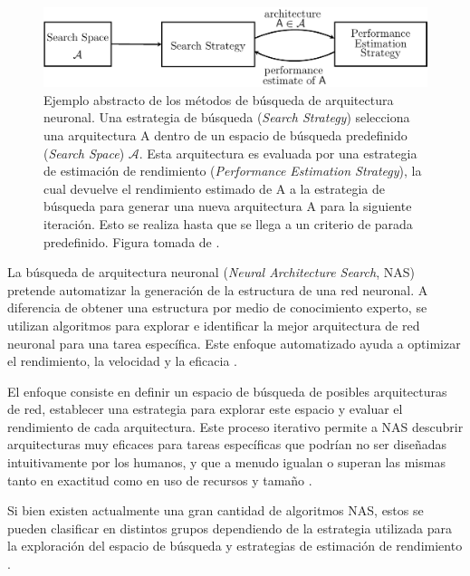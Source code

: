 \begin{figure}[h]
    \centering
    \includegraphics[width=0.8\linewidth]{figures/2_theory/nas_example.pdf}
    \caption[Ejemplo abstracto de los métodos de búsqueda de arquitectura neuronal]{Ejemplo abstracto de los métodos de búsqueda de arquitectura neuronal. Una estrategia de búsqueda (\textit{Search Strategy}) selecciona una arquitectura A dentro de un espacio de búsqueda predefinido (\textit{Search Space}) $\mathcal{A}$. Esta arquitectura es evaluada por una estrategia de estimación de rendimiento (\textit{Performance Estimation Strategy}), la cual devuelve el rendimiento estimado de A a la estrategia de búsqueda para generar una nueva arquitectura A para la siguiente iteración. Esto se realiza hasta que se llega a un criterio de parada predefinido. Figura tomada de \cite{elsken_neural_2018}.}

    \label{nas_example}
\end{figure}

La búsqueda de arquitectura neuronal (\textit{Neural Architecture Search}, NAS) \cite{zoph_neural_2017} pretende automatizar la generación de la estructura de una red neuronal. A diferencia de obtener una estructura por medio de conocimiento experto, se utilizan algoritmos para explorar e identificar la mejor arquitectura de red neuronal para una tarea específica. Este enfoque automatizado ayuda a optimizar el rendimiento, la velocidad y la eficacia \cite{ultralytics_busqueda_nas}.

El enfoque consiste en definir un espacio de búsqueda de posibles arquitecturas de red, establecer una estrategia para explorar este espacio y evaluar el rendimiento de cada arquitectura. Este proceso iterativo permite a NAS descubrir arquitecturas muy eficaces para tareas específicas que podrían no ser diseñadas intuitivamente por los humanos, y que a menudo igualan o superan las mismas tanto en exactitud como en uso de recursos y tamaño \cite{poyser_neural_2024}.

Si bien existen actualmente una gran cantidad de algoritmos NAS, estos se pueden clasificar en distintos grupos dependiendo de la estrategia utilizada para la exploración del espacio de búsqueda y estrategias de estimación de rendimiento \cite{elsken_neural_2018, baymurzina_review_2022, white_neural_2023}.

